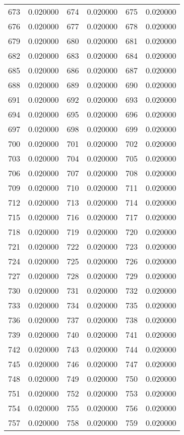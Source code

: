 \documentclass[12pt]{article}
\begin{document}
\begin{longtable}{@{}cc|cc|cc@{}}
673 & 0.020000 & 674 & 0.020000 & 675 & 0.020000 \\
676 & 0.020000 & 677 & 0.020000 & 678 & 0.020000 \\
679 & 0.020000 & 680 & 0.020000 & 681 & 0.020000 \\
682 & 0.020000 & 683 & 0.020000 & 684 & 0.020000 \\
685 & 0.020000 & 686 & 0.020000 & 687 & 0.020000 \\
688 & 0.020000 & 689 & 0.020000 & 690 & 0.020000 \\
691 & 0.020000 & 692 & 0.020000 & 693 & 0.020000 \\
694 & 0.020000 & 695 & 0.020000 & 696 & 0.020000 \\
697 & 0.020000 & 698 & 0.020000 & 699 & 0.020000 \\
700 & 0.020000 & 701 & 0.020000 & 702 & 0.020000 \\
703 & 0.020000 & 704 & 0.020000 & 705 & 0.020000 \\
706 & 0.020000 & 707 & 0.020000 & 708 & 0.020000 \\
709 & 0.020000 & 710 & 0.020000 & 711 & 0.020000 \\
712 & 0.020000 & 713 & 0.020000 & 714 & 0.020000 \\
715 & 0.020000 & 716 & 0.020000 & 717 & 0.020000 \\
718 & 0.020000 & 719 & 0.020000 & 720 & 0.020000 \\
721 & 0.020000 & 722 & 0.020000 & 723 & 0.020000 \\
724 & 0.020000 & 725 & 0.020000 & 726 & 0.020000 \\
727 & 0.020000 & 728 & 0.020000 & 729 & 0.020000 \\
730 & 0.020000 & 731 & 0.020000 & 732 & 0.020000 \\
733 & 0.020000 & 734 & 0.020000 & 735 & 0.020000 \\
736 & 0.020000 & 737 & 0.020000 & 738 & 0.020000 \\
739 & 0.020000 & 740 & 0.020000 & 741 & 0.020000 \\
742 & 0.020000 & 743 & 0.020000 & 744 & 0.020000 \\
745 & 0.020000 & 746 & 0.020000 & 747 & 0.020000 \\
748 & 0.020000 & 749 & 0.020000 & 750 & 0.020000 \\
751 & 0.020000 & 752 & 0.020000 & 753 & 0.020000 \\
754 & 0.020000 & 755 & 0.020000 & 756 & 0.020000 \\
757 & 0.020000 & 758 & 0.020000 & 759 & 0.020000 \\

\end{longtable}
\end{document}
